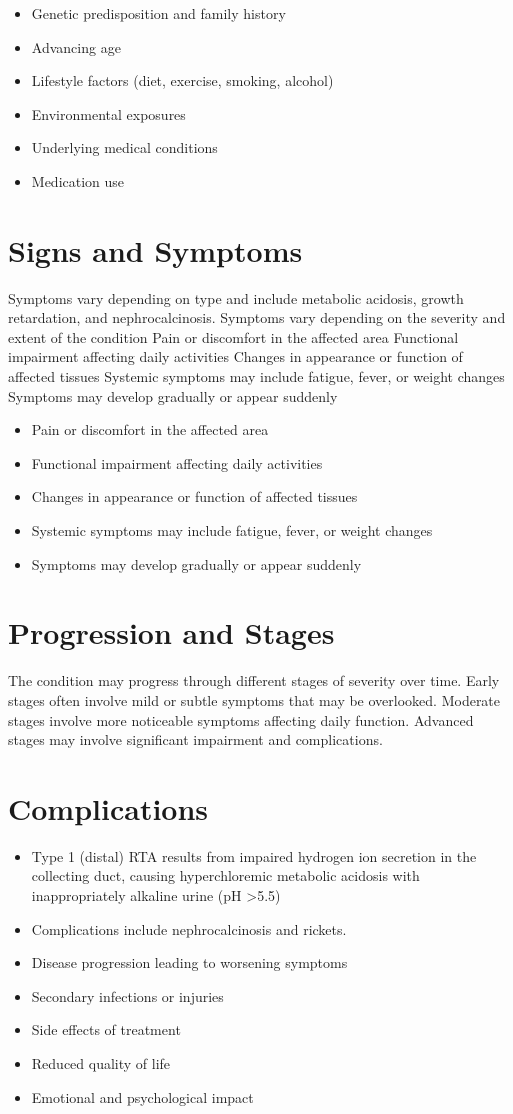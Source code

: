 \begin{itemize}[noitemsep]
  \item Genetic predisposition and family history
  \item Advancing age
  \item Lifestyle factors (diet, exercise, smoking, alcohol)
  \item Environmental exposures
  \item Underlying medical conditions
  \item Medication use
\end{itemize}
\section{Signs and Symptoms}
Symptoms vary depending on type and include metabolic acidosis, growth retardation, and nephrocalcinosis. Symptoms vary depending on the severity and extent of the condition Pain or discomfort in the affected area Functional impairment affecting daily activities Changes in appearance or function of affected tissues Systemic symptoms may include fatigue, fever, or weight changes Symptoms may develop gradually or appear suddenly

\begin{itemize}[noitemsep]
  \item Pain or discomfort in the affected area
  \item Functional impairment affecting daily activities
  \item Changes in appearance or function of affected tissues
  \item Systemic symptoms may include fatigue, fever, or weight changes
  \item Symptoms may develop gradually or appear suddenly
\end{itemize}
\section{Progression and Stages}
The condition may progress through different stages of severity over time. Early stages often involve mild or subtle symptoms that may be overlooked. Moderate stages involve more noticeable symptoms affecting daily function. Advanced stages may involve significant impairment and complications.
\section{Complications}
\begin{itemize}[noitemsep]
  \item Type 1 (distal) RTA results from impaired hydrogen ion secretion in the collecting duct, causing hyperchloremic metabolic acidosis with inappropriately alkaline urine (pH >5.5)
  \item Complications include nephrocalcinosis and rickets.
  \item Disease progression leading to worsening symptoms
  \item Secondary infections or injuries
  \item Side effects of treatment
  \item Reduced quality of life
  \item Emotional and psychological impact
\end{itemize}
